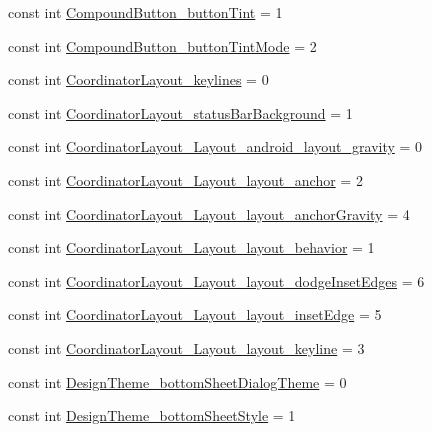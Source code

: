 \begin{CompactItemize}
\item 
const int \hyperlink{class__2doo_1_1_droid_1_1_resource_1_1_styleable_4a7dbac57c07a360fa5ae3e74152fc3b}{CompoundButton\_\-buttonTint} = 1
\item 
const int \hyperlink{class__2doo_1_1_droid_1_1_resource_1_1_styleable_ed7be3658b36bdc971be0035dd8bf774}{CompoundButton\_\-buttonTintMode} = 2
\item 
const int \hyperlink{class__2doo_1_1_droid_1_1_resource_1_1_styleable_8dee656d6d34a5ad7687d54d196e309e}{CoordinatorLayout\_\-keylines} = 0
\item 
const int \hyperlink{class__2doo_1_1_droid_1_1_resource_1_1_styleable_28db8db9492d7ff2919df557ebeceb33}{CoordinatorLayout\_\-statusBarBackground} = 1
\item 
const int \hyperlink{class__2doo_1_1_droid_1_1_resource_1_1_styleable_e60ac90f80817ae0b33b64cdf9af5671}{CoordinatorLayout\_\-Layout\_\-android\_\-layout\_\-gravity} = 0
\item 
const int \hyperlink{class__2doo_1_1_droid_1_1_resource_1_1_styleable_f6b7bb0c2025c29bd3bb9677769d9acc}{CoordinatorLayout\_\-Layout\_\-layout\_\-anchor} = 2
\item 
const int \hyperlink{class__2doo_1_1_droid_1_1_resource_1_1_styleable_d23824ed611320861436e5ddc1181dfd}{CoordinatorLayout\_\-Layout\_\-layout\_\-anchorGravity} = 4
\item 
const int \hyperlink{class__2doo_1_1_droid_1_1_resource_1_1_styleable_dc8d547bf8e97c26243674ebabeb9224}{CoordinatorLayout\_\-Layout\_\-layout\_\-behavior} = 1
\item 
const int \hyperlink{class__2doo_1_1_droid_1_1_resource_1_1_styleable_1b6a8b10e365c1eddc1f5eb2c280651e}{CoordinatorLayout\_\-Layout\_\-layout\_\-dodgeInsetEdges} = 6
\item 
const int \hyperlink{class__2doo_1_1_droid_1_1_resource_1_1_styleable_25e99117549f72b59de5b373303b6f2a}{CoordinatorLayout\_\-Layout\_\-layout\_\-insetEdge} = 5
\item 
const int \hyperlink{class__2doo_1_1_droid_1_1_resource_1_1_styleable_8f49439118aa64033e0461a2349b1e15}{CoordinatorLayout\_\-Layout\_\-layout\_\-keyline} = 3
\item 
const int \hyperlink{class__2doo_1_1_droid_1_1_resource_1_1_styleable_45ee134c24a4d33e74d3348af2984533}{DesignTheme\_\-bottomSheetDialogTheme} = 0
\item 
const int \hyperlink{class__2doo_1_1_droid_1_1_resource_1_1_styleable_2609181fa880372ea5f631aef702b115}{DesignTheme\_\-bottomSheetStyle} = 1

\end{CompactItemize}
